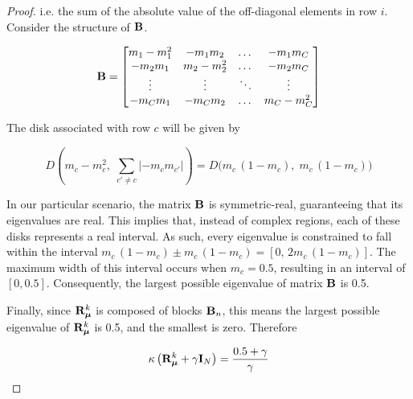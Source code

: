\begin{proof}
    i.e. the sum of the absolute value of the off-diagonal elements in row $i$. Consider the structure of $\mathbf{B}$. 

    \begin{equation*}
        \mathbf{B} = \begin{bmatrix}
            m_1 - m_1^2 & -m_1 m_2 & \dots & - m_1 m_C \\
            - m_2 m_1 & m_2 - m_2^2 & \dots & -m_2 m_C \\
            \vdots & \vdots & \ddots & \vdots \\
            -m_C m_1 & -m_C m_2 & \dots &m_C- m_C^2
        \end{bmatrix}
    \end{equation*}
    
    The disk associated with row $c$ will be given by

    $$
    D\left(m_c - m_c^2, \; \sum_{c' \neq c} |-m_c m_{c'}|\right) = D\big(m_c\,(1 - m_c), \; m_c\,(1 - m_c)\big)
    $$
    
    In our particular scenario, the matrix $\mathbf{B}$ is symmetric-real, guaranteeing that its eigenvalues are real. This implies that, instead of complex regions, each of these disks represents a real interval. As such, every eigenvalue is constrained to fall within the interval $m_c\,(1 - m_c) \pm m_c\,(1 - m_c) = [0, \, 2 m_c\,(1 - m_c)]$. The maximum width of this interval occurs when $m_c = 0.5$, resulting in an interval of $[0, 0.5]$. Consequently, the largest possible eigenvalue of matrix $\mathbf{B}$ is 0.5.

    Finally, since $\mathbf{R}_{\boldsymbol{\mu}}^k$ is composed of blocks $\mathbf{B}_n$, this means the largest possible eigenvalue of $\mathbf{R}_{\boldsymbol{\mu}}^k$ is 0.5, and the smallest is zero. Therefore

    \begin{equation*}
        \kappa\left( \mathbf{R}_{\boldsymbol{\mu}}^k + \gamma \mathbf{I}_N\right) = \frac{0.5 + \gamma}{\gamma}
    \end{equation*}



    


\end{proof}
